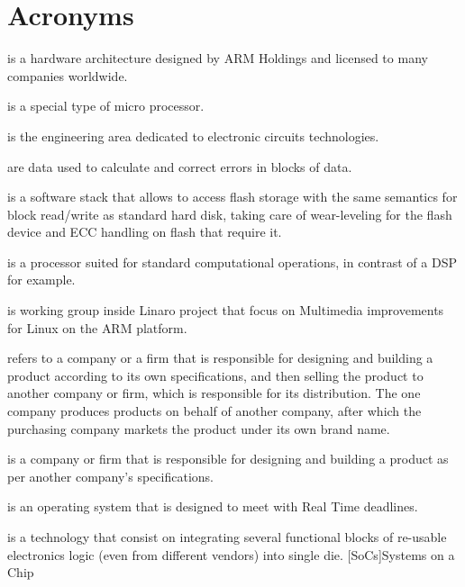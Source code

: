 \chapter{Acronyms}

\begin{acronym}

 is a hardware architecture designed by ARM Holdings and licensed to many companies worldwide.

 is a special type of micro processor.

 is the engineering area dedicated to electronic circuits technologies.

 are data used to calculate and correct errors in blocks of data.

 is a software stack that allows to access flash storage with the same semantics for block read/write as standard hard disk, taking care of wear-leveling for the flash device and \ac{ECC} handling on flash that require it.

 is a processor suited for standard computational operations, in contrast of a \ac{DSP} for example.

 is working group inside Linaro project that focus on Multimedia improvements for Linux on the \ac{ARM} platform.

 refers to a company or a firm that is responsible for designing and building a product according to its own specifications, and then selling the product to another company or firm, which is responsible for its distribution. The one company produces products on behalf of another company, after which the purchasing company markets the product under its own brand name\cite{:uq}.

 is a company or firm that is responsible for designing and building a product as per another company’s specifications\cite{:uq}.



 is an operating system that is designed to meet with Real Time deadlines.

 is a technology that consist on integrating several functional blocks of re-usable electronics logic (even from different vendors) into single die.
[SoCs]{Systems on a Chip}

\end{acronym}

